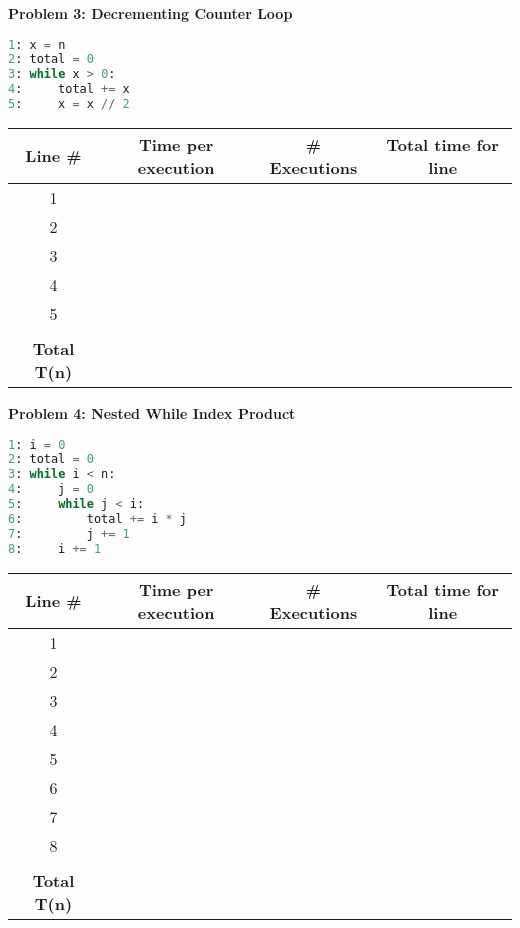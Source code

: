 \documentclass[11pt]{article}
\newenvironment{problem}{\vspace{1em}\noindent}{\vspace{2em}}
\begin{document}
\begin{problem}
\textbf{Problem 3: Decrementing Counter Loop}

\begin{lstlisting}[language=Python]
1: x = n
2: total = 0
3: while x > 0:
4:     total += x
5:     x = x // 2
\end{lstlisting}

\begin{tabular}{|c|c|c|c|}
\hline
Line \# & Time per execution & \# Executions & Total time for line \\
\hline
1 & & & \\
2 & & & \\
3 & & & \\
4 & & & \\
5 & & & \\
\hline
 & & & \\
\textbf{Total T(n)} & & & \\
\hline
\end{tabular}
\end{problem}

\begin{problem}
\textbf{Problem 4: Nested While Index Product}

\begin{lstlisting}[language=Python]
1: i = 0
2: total = 0
3: while i < n:
4:     j = 0
5:     while j < i:
6:         total += i * j
7:         j += 1
8:     i += 1
\end{lstlisting}

\begin{tabular}{|c|c|c|c|}
\hline
Line \# & Time per execution & \# Executions & Total time for line \\
\hline
1 & & & \\
2 & & & \\
3 & & & \\
4 & & & \\
5 & & & \\
6 & & & \\
7 & & & \\
8 & & & \\
\hline
 & & & \\
\textbf{Total T(n)} & & & \\
\hline
\end{tabular}
\end{problem}
\end{document}
